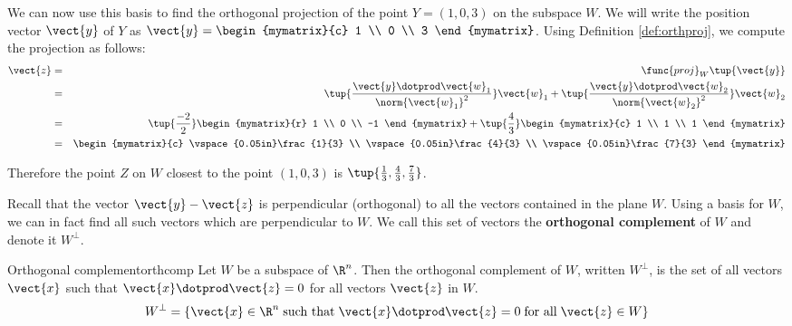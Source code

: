 \begin{solution}
We can now use this basis to find the orthogonal projection of the
point $Y=(1,0,3)$ on the subspace $W$. We will write the position
vector $\vect{y}$ of $Y$ as $\vect{y} = \begin{mymatrix}{c} 1 \\ 0 \\ 3
\end{mymatrix}$. Using Definition \ref{def:orthproj}, we compute the projection as follows:
\begin{eqnarray*}
\vect{z} &=& \func{proj}_{W}\tup{\vect{y}}\\
&=&
\tup{\frac{\vect{y} \dotprod \vect{w}_1}{ \norm{\vect{w}_1}^2}} \vect{w}_1
+
\tup{\frac{\vect{y} \dotprod \vect{w}_2}{ \norm{\vect{w}_2}^2}} \vect{w}_2 \\
&=&
\tup{\frac{-2}{2} } \begin{mymatrix}{r}
1 \\
0 \\
-1
\end{mymatrix}
+
\tup{\frac{4}{3} }
\begin{mymatrix}{c}
1 \\
1 \\
1 
\end{mymatrix} \\
&=& 
\begin{mymatrix}{c}
\vspace{0.05in}\frac{1}{3} \\
\vspace{0.05in}\frac{4}{3} \\
\vspace{0.05in}\frac{7}{3} 
\end{mymatrix}
\end{eqnarray*}

Therefore the point $Z$ on $W$ closest to the point $(1,0,3)$  is $\tup{\frac{1}{3}, \frac{4}{3}, \frac{7}{3} }$. 

\end{solution}

Recall that the vector $\vect{y} - \vect{z}$ is perpendicular
(orthogonal) to all the vectors contained in the plane $W$. Using a
basis for $W$, we can in fact find all such vectors which are
perpendicular to $W$. We call this set of vectors the
\textbf{orthogonal complement} of $W$ and
denote it $W^{\perp}$.

\begin{definition}{Orthogonal complement}{orthcomp}
Let $W$ be a subspace of $\R^n$. Then the orthogonal
complement of $W$, written $W^{\perp}$, is the set of all vectors
$\vect{x}$ such that $\vect{x} \dotprod \vect{z} = 0$ for all vectors
$\vect{z}$ in $W$.
\[
W^{\perp} = \{\vect{x} \in \R^n \; \mbox{such that} \;
\vect{x} \dotprod \vect{z} = 0 \; \mbox{for all} \; \vect{z} \in W\}
\]
\end{definition}

